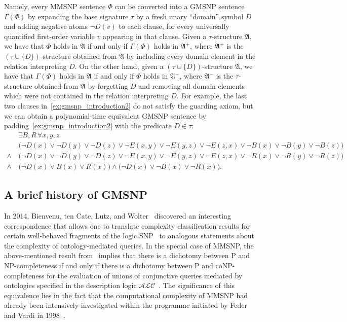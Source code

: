 \documentclass[oneside,reqno,12pt]{amsart}
\theoremstyle{plain}
\theoremstyle{remark}
\newcommand{\struct}[1]{\mathfrak{#1}}
\begin{document}
Namely, every MMSNP sentence $\Phi$ can be converted into a GMSNP sentence $\Gamma(\Phi)$ by expanding the base signature $\tau$ by a fresh unary ``domain'' symbol $D$ and adding negative atoms $\neg D(v)$ to each clause, for every universally quantified first-order variable $v$ appearing in that clause.
Given a $\tau$-structure $\struct{A}$, we have that $\Phi$ holds in $\struct{A}$ if and only if $\Gamma(\Phi)$ holds in $\struct{A}^+$, where $\struct{A}^+$ is the $(\tau\cup \{D\})$-structure  obtained from $\struct{A}$ by including every domain element in the relation interpreting $D$. 
On the other hand, given a $(\tau\cup \{D\})$-structure $\struct{A}$, we have that $\Gamma(\Phi)$ holds in $\struct{A}$ if and only if $\Phi$ holds in $\struct{A}^{-}$, where $\struct{A}^{-}$ is the $\tau$-structure obtained from $\struct{A}$ by forgetting $D$ and removing all domain elements which were not contained in the relation interpreting $D$. 
For example, the last two clauses in~\eqref{ex:gmsnp_introduction2} do not satisfy the guarding axiom, but we can obtain a polynomial-time equivalent  GMSNP sentence by padding~\eqref{ex:gmsnp_introduction2} with the predicate $D\in \tau$:
\begin{align*}
   &  \exists B, R\,   \forall x,y,z  \\
  \!\!\!\!  & \big(     \neg D(x) \vee \neg D(y) \vee \neg D(z) \vee \neg E(x,y) \vee   \neg  E(y,z) \vee \neg E(z,x)  \vee \neg B(x) \vee   \neg  B(y) \vee \neg B(z)   
    \big)  \\
    \!\!\!\! {} \wedge \,  &\big(    \neg D(x) \vee \neg D(y) \vee \neg D(z) \vee  \neg E(x,y) \vee   \neg  E(y,z) \vee \neg E(z,x) \vee \neg R(x) \vee   \neg  R(y) \vee \neg R(z)   
    \big)\\
  \!\!\!\! {} \wedge \, &\big( \neg D(x) \vee B(x) \vee R(x) \big) \wedge   \big( \neg D(x) \vee  \neg B(x) \vee \neg  R(x) \big). 
\end{align*}




\subsection{A brief history of GMSNP}

In 2014, Bienvenu, ten Cate, Lutz, and Wolter~\cite{bienvenu2014} discovered an interesting correspondence that allows one to translate complexity classification results for certain well-behaved fragments of the logic SNP~\cite{kolaitis1987decision,papadimitriou1988optimization}  to analogous  statements about the complexity of ontology-mediated queries.
In the special case of MMSNP, the above-mentioned result from~\cite{bienvenu2014} implies that there is a dichotomy between \textsf{P} and 
\textsf{NP}-completeness if and only if there is a dichotomy between \textsf{P} and 
\textsf{coNP}-completeness for the evaluation of unions of conjunctive queries mediated by ontologies specified in the description logic $\mathcal{ALC}$~\cite{baader2003description_corrected}.  
The significance of this equivalence  lies in the fact that the computational complexity of MMSNP had  already been intensively investigated within the programme initiated by Feder and Vardi in 1998~\cite{federvardi1998}.
\end{document}
